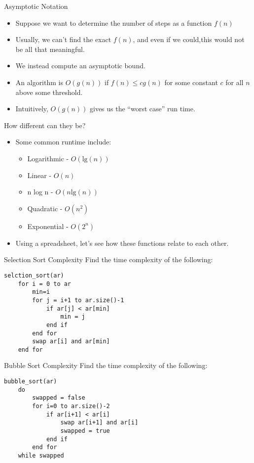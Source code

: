 \documentclass[]{beamer}
\begin{document}
\begin{frame}{Asymptotic Notation}
\begin{itemize}[<+->]
    \item Suppose we want to determine the number of steps as
        a function $f(n)$
    \item Usually, we can't find the exact $f(n)$, and even if we
        could,this would not be all that meaningful.
    \item We instead compute an asymptotic bound.
    \item An algorithm is $O(g(n))$ if $f(n) \leq c g(n)$ for some
        constant $c$ for all $n$ above some threshold.
    \item Intuitively, $O(g(n))$ gives us the ``worst case'' run time.
\end{itemize}
\end{frame}

\begin{frame}{How different can they be?}
    \begin{itemize}[<+->]
        \item Some common runtime include:
        \begin{itemize}
            \item Logarithmic  - $O(\mathrm{lg}(n))$
            \item Linear - $O(n)$
            \item n log n - $O(n \mathrm{lg}(n))$
            \item Quadratic - $O(n^2)$
            \item Exponential - $O(2^n)$
        \end{itemize}
        \item Using a spreadsheet, let's see how these functions relate
            to each other.
    \end{itemize}
\end{frame}

\begin{frame}[fragile]{Selection Sort Complexity}
Find the time complexity of the following:
\begin{verbatim}
selction_sort(ar)
    for i = 0 to ar
        min=i
        for j = i+1 to ar.size()-1
            if ar[j] < ar[min] 
                min = j
            end if
        end for
        swap ar[i] and ar[min]
    end for
\end{verbatim}
\end{frame}

\begin{frame}[fragile]{Bubble Sort Complexity}
Find the time complexity of the following:
\begin{verbatim}
bubble_sort(ar)
    do
        swapped = false
        for i=0 to ar.size()-2
            if ar[i+1] < ar[i]
                swap ar[i+1] and ar[i]
                swapped = true
            end if
        end for
    while swapped
\end{verbatim}
\end{frame}
\end{document}
